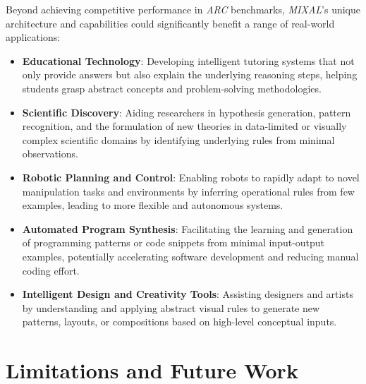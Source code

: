 \documentclass[12pt]{article}
\newcommand{\arc}{\textit{ARC}}
\newcommand{\MIXAL}{\textit{MIXAL}}
\begin{document}
Beyond achieving competitive performance in \arc{} benchmarks, \MIXAL{}'s unique architecture and capabilities could significantly benefit a range of real-world applications:
\begin{itemize}[noitemsep,topsep=0pt]
\item\textbf{Educational Technology}: Developing intelligent tutoring systems that not only provide answers but also explain the underlying reasoning steps, helping students grasp abstract concepts and problem-solving methodologies.
\item\textbf{Scientific Discovery}: Aiding researchers in hypothesis generation, pattern recognition, and the formulation of new theories in data-limited or visually complex scientific domains by identifying underlying rules from minimal observations.
\item\textbf{Robotic Planning and Control}: Enabling robots to rapidly adapt to novel manipulation tasks and environments by inferring operational rules from few examples, leading to more flexible and autonomous systems.
\item\textbf{Automated Program Synthesis}: Facilitating the learning and generation of programming patterns or code snippets from minimal input-output examples, potentially accelerating software development and reducing manual coding effort.
\item\textbf{Intelligent Design and Creativity Tools}: Assisting designers and artists by understanding and applying abstract visual rules to generate new patterns, layouts, or compositions based on high-level conceptual inputs.
\end{itemize}

\section{Limitations and Future Work}
\end{document}
